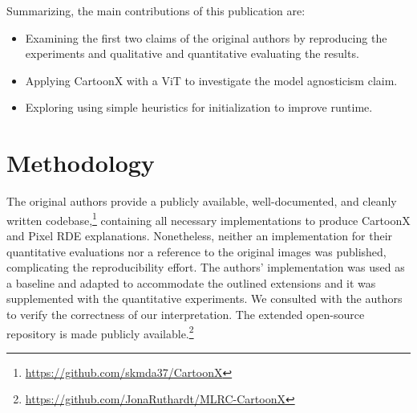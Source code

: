 Summarizing, the main contributions of this publication are:
\begin{itemize}
\setlength\itemsep{-0.1em}
    \item Examining the first two claims of the original authors by reproducing the experiments and qualitative and quantitative evaluating the results.
    \item Applying CartoonX with a ViT to investigate the model agnosticism claim.
    \item Exploring using simple heuristics for initialization to improve runtime.
\end{itemize}



\section{Methodology}\label{sec:meth}

The original authors provide a publicly available, well-documented, and cleanly written codebase,\footnote{\url{https://github.com/skmda37/CartoonX}} containing all necessary implementations to produce CartoonX and Pixel RDE explanations. Nonetheless, neither an implementation for their quantitative evaluations nor a reference to the original images was published, complicating the reproducibility effort. The authors' implementation was used as a baseline and adapted to accommodate the outlined extensions and it was supplemented with the quantitative experiments. We consulted with the authors to verify the correctness of our interpretation. The extended open-source repository is made publicly available.\footnote{\url{https://github.com/JonaRuthardt/MLRC-CartoonX}}


